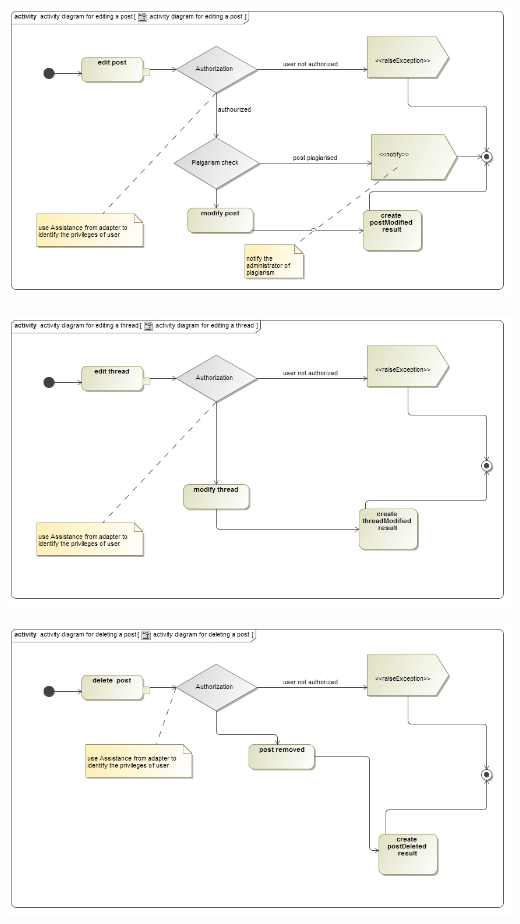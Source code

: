 \documentclass[12pt, oneside]{article}
\begin{document}
		  \includegraphics[scale=0.45]{editPostNew}
		 \newline	
		 
		  \includegraphics[scale=0.45]{editThreadNew}
		 \newline	 
		 
		  \includegraphics[scale=0.45]{deletePostNew}
		 \newline
		 
\end{document}
